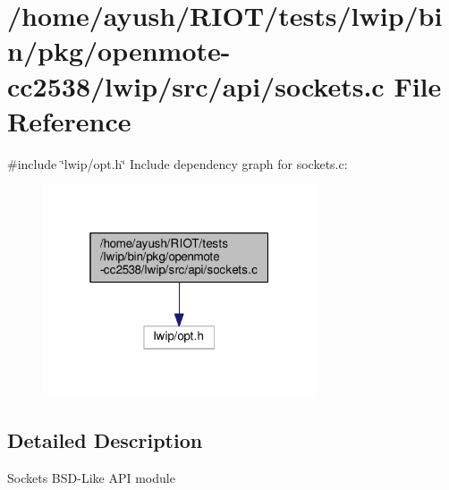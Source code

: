 \hypertarget{openmote-cc2538_2lwip_2src_2api_2sockets_8c}{}\section{/home/ayush/\+R\+I\+O\+T/tests/lwip/bin/pkg/openmote-\/cc2538/lwip/src/api/sockets.c File Reference}
\label{openmote-cc2538_2lwip_2src_2api_2sockets_8c}
{\ttfamily \#include \char`\"{}lwip/opt.\+h\char`\"{}}\newline
Include dependency graph for sockets.\+c\+:
\nopagebreak
\begin{figure}[H]
\begin{center}
\leavevmode
\includegraphics[width=229pt]{openmote-cc2538_2lwip_2src_2api_2sockets_8c__incl}
\end{center}
\end{figure}


\subsection{Detailed Description}
Sockets B\+S\+D-\/\+Like A\+PI module 
